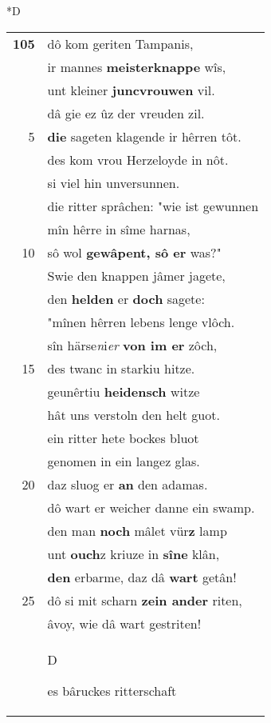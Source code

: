\documentclass[8pt,a4paper,notitlepage]{article}
\begin{document}
\begin{table}[ht]
\begin{minipage}[t]{0.5\linewidth}
\small
\begin{center}*D
\end{center}
\begin{tabular}{rl}
\textbf{105} & dô kom geriten Tampanis,\\ 
 & ir mannes \textbf{meisterknappe} wîs,\\ 
 & unt kleiner \textbf{juncvrouwen} vil.\\ 
 & dâ gie ez ûz der vreuden zil.\\ 
5 & \textbf{die} sageten klagende ir hêrren tôt.\\ 
 & des kom vrou Herzeloyde in nôt.\\ 
 & si viel hin unversunnen.\\ 
 & die ritter sprâchen: "wie ist gewunnen\\ 
 & mîn hêrre in sîme harnas,\\ 
10 & sô wol \textbf{gewâpent, sô er} was?"\\ 
 & Swie den knappen jâmer jagete,\\ 
 & den \textbf{helden} er \textbf{doch} sagete:\\ 
 & "mînen hêrren lebens lenge vlôch.\\ 
 & sîn härse\textit{n}i\textit{er} \textbf{von im er} zôch,\\ 
15 & des twanc in starkiu hitze.\\ 
 & geunêrtiu \textbf{heidensch} witze\\ 
 & hât uns verstoln den helt guot.\\ 
 & ein ritter hete bockes bluot\\ 
 & genomen in ein langez glas.\\ 
20 & daz sluog er \textbf{an} den adamas.\\ 
 & dô wart er weicher danne ein swamp.\\ 
 & den man \textbf{noch} mâlet vür\textbf{z} lamp\\ 
 & unt \textbf{ouch}z kriuze in \textbf{sîne} klân,\\ 
 & \textbf{den} erbarme, daz dâ \textbf{wart} getân!\\ 
25 & dô si mit scharn \textbf{zein ander} riten,\\ 
 & âvoy, wie dâ wart gestriten!\\ 
 & \begin{large}D\end{large}es bâruckes ritterschaft\\ 

\end{tabular}
\end{minipage}
\end{table}
\end{document}
